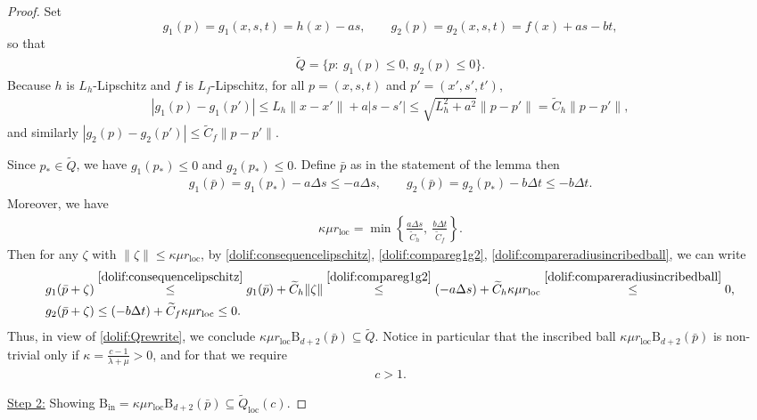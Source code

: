 \documentclass[11pt,letterpaper]{article}
\newcommand{\ball}{\mathrm{B}}
\newcommand{\local}{\mathrm{loc}}
\newcommand{\Q}{\widetilde{Q}}
\begin{document}
\begin{proof}
\smallskip
Set
\[
g_1( p)=g_1(x,s,t)=h(x)-a s,
\qquad
g_2( p)=g_2(x,s,t)=f(x)+a s-b t,
\]
so that 
\begin{align}
\label{dolif:Qrewrite}
    \Q=\{ p:\ g_1( p)\le 0,\ g_2( p)\le 0\}. 
\end{align}
Because $h$ is $L_h$-Lipschitz and $f$ is $L_f$-Lipschitz, for all $ p=(x,s,t)$ and $ p'=(x',s',t')$,
\begin{align}
\label{dolif:consequencelipschitz}
|g_1( p)-g_1( p')|
\le L_h\|x-x'\|+a|s-s'|
\le \sqrt{L_h^2+a^2} \| p- p'\|
= \widetilde{C}_h\| p- p'\|,
\end{align}
and similarly $|g_2( p)-g_2( p')|\le \widetilde{C}_f\| p- p'\|$.

Since $ p_*\in \Q$, we have $g_1( p_*)\le 0$ and $g_2( p_*)\le 0$.
Define $\bar p$ as in the statement of the lemma then
\begin{align}
\label{dolif:compareg1g2}
g_1(\bar p)=g_1( p_*)-a\Delta s\le -a\Delta s,
\qquad
g_2(\bar p)=g_2( p_*)-b\Delta t\le -b\Delta t.
\end{align}
Moreover, we have 
\begin{align}
\label{dolif:compareradiusincribedball}
\kappa\mu r_\local=\min\left\{\frac{a\Delta s}{\widetilde{C}_h},\ \frac{b\Delta t}{\widetilde{C}_f}\right\}.
\end{align}
Then for any $\zeta$ with $\|\zeta\|\le \kappa\mu r_\local$, by \eqref{dolif:consequencelipschitz}, \eqref{dolif:compareg1g2}, \eqref{dolif:compareradiusincribedball}, we can write
\begin{align*}
g_1(\bar p+\zeta)&\stackrel{\eqref{dolif:consequencelipschitz}}{\le} g_1(\bar p)+\widetilde{C}_h\|\zeta\|\stackrel{\eqref{dolif:compareg1g2}}{\le} (-a\Delta s)+\widetilde{C}_h \kappa\mu r_\local\stackrel{\eqref{dolif:compareradiusincribedball}}{\le} 0,\\
g_2(\bar p+\zeta)&\le (-b\Delta t)+\widetilde{C}_f \kappa\mu r_\local\le 0. 
\end{align*}
Thus, in view of \eqref{dolif:Qrewrite}, we conclude $\kappa\mu r_\local \ball_{d+2}(\bar p)\subseteq \Q$. Notice in particular that the inscribed ball $\kappa\mu r_\local \ball_{d+2}(\bar p)$ is non-trivial only if $\kappa=\frac{c-1}{\lambda+\mu}>0$, and for that we require
\begin{align}
\label{dolif:whyc>1}
    c>1. 
    \end{align}

\smallskip
\underline{Step 2:} Showing $\ball_{\mathrm{in}}=\kappa\mu r_\local \ball_{d+2}(\bar p)\subseteq \Q_\local(c)$.


\end{proof}
\end{document}
